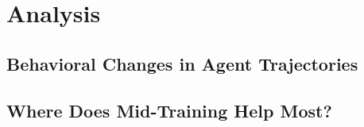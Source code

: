\documentclass{article}
\begin{document}
\section{Analysis}
\label{sec:analysis}


%
\subsection{Behavioral Changes in Agent Trajectories}
\label{sec:analysis:behavior}



%
\subsection{Where Does Mid-Training Help Most?}
\label{sec:analysis:failure}



%
%
\end{document}
